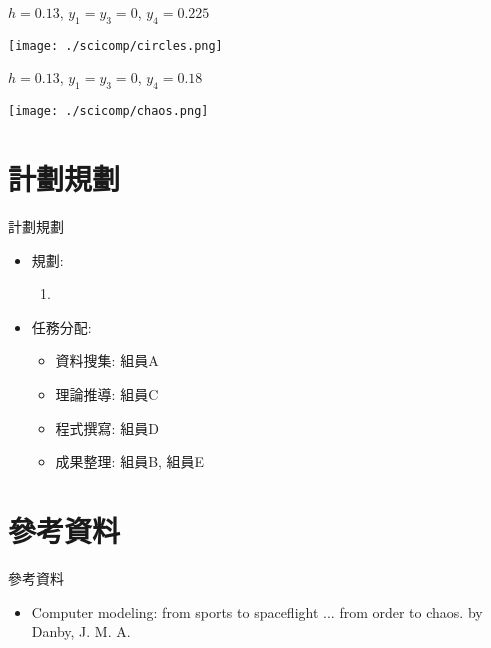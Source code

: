 \documentclass[11pt]{beamer}
\begin{document}
\begin{frame}{$h=0.13$, $y_1=y_3=0$, $y_4=0.225$}

\texttt{[image: ./scicomp/circles.png]}

\end{frame}
\begin{frame}{$h=0.13$, $y_1=y_3=0$, $y_4=0.18$}

\texttt{[image: ./scicomp/chaos.png]}

\end{frame}

\section{計劃規劃}
\begin{frame}{計劃規劃}
\begin{itemize}
\item 規劃:
\begin{enumerate}
\item
\end{enumerate}
\item 任務分配:
\begin{itemize}
\item 資料搜集: 組員A
\item 理論推導: 組員C
\item 程式撰寫: 組員D
\item 成果整理: 組員B, 組員E
\end{itemize}
\end{itemize}

\end{frame}

\section{參考資料}
\begin{frame}{參考資料}
\begin{itemize}
\item Computer modeling: from sports to spaceflight ... from order to
chaos. by Danby, J. M. A.
\end{itemize}

\end{frame}
\end{document}
